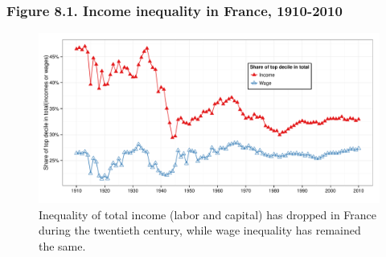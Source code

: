 \documentclass[t]{beamer}\usepackage[]{graphicx}\usepackage[]{color}
\newenvironment{knitrout}{}{} %
\begin{document}
\begin{frame}[label=Figure_8_1,fragile]
\frametitle{Figure 8.1. Income inequality in France, 1910-2010}
\begin{figure}[t]
\begin{minipage}[b]{\textwidth}
\centering
\begin{knitrout}\footnotesize
{}\color{fgcolor}

{\centering \includegraphics[width=1\linewidth]{figures/color/Figure_8_1} 

}



\end{knitrout}
\caption{Inequality of total income (labor and capital) has dropped in France during the twentieth century, while wage inequality has remained the same.}
\end{minipage}
\end{figure}
\end{frame}
\end{document}
